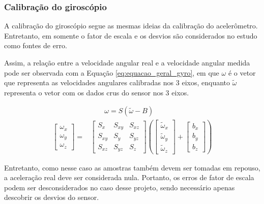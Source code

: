 \documentclass[acronym, symbols, table, deposito]{fei}
\begin{document}
		\subsubsection{Calibração do giroscópio}\label{sec:calibracao_giroscopio}
		
		A calibração do giroscópio segue as mesmas ideias da calibração do acelerômetro. Entretanto, em \textcite{hassan2020field} somente o fator de escala e os desvios são considerados no estudo como fontes de erro.
		
		Assim, a relação entre a velocidade angular real e a velocidade angular medida pode ser observada com a Equação \eqref{eq:equacao_geral_gyro}, em que $\omega$ é o vetor que representa as velocidades angulares calibradas nos 3 eixos, enquanto $\tilde{\omega}$ representa o vetor com os dados crus do sensor nos 3 eixos.
		
		\begin{equation}\label{eq:equacao_geral_gyro}
			\begin{split}
				&\quad \quad \omega = S(\tilde{\omega} - B) \\
				\begin{bmatrix}
					\omega_x \\ \omega_y \\ \omega_z
				\end{bmatrix} = 
				&\begin{bmatrix}
					S_x & S_{xy} & S_{xz} \\ S_{xy} & S_y & S_{yz} \\ S_{xz} & S_{yz} & S_z
				\end{bmatrix} \left(
				\begin{bmatrix}
					\tilde{\omega}_x \\ \tilde{\omega}_y \\ \tilde{\omega}_z
				\end{bmatrix} + 
				\begin{bmatrix}
					b_x \\ b_y \\ b_z
				\end{bmatrix}\right)
			\end{split}
		\end{equation}
		
		Entretanto, como nesse caso as amostras também devem ser tomadas em repouso, a aceleração real deve ser considerada nula. Portanto, os erros de fator de escala podem ser desconsiderados no caso desse projeto, sendo necessário apenas descobrir os desvios do sensor.
				
\end{document}
